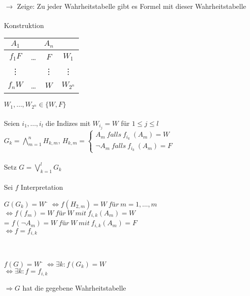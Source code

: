 \noindent\\
$\rightarrow$ Zeige: Zu jeder Wahrheitstabelle gibt es Formel mit dieser Wahrheitstabelle\\
    
\noindent\\
Konstruktion\\

\begin{tabular}{c|c|c|c}
$A_1$ &  & $A_n$ &  \\
\hline
$f_1 F$ & … & $F$ & $W_1$\\
\vdots   &  & \vdots & \vdots \\
$f_n W$ & … & $W$ & $W_{2^n}$ \\
\end{tabular}
\hspace{1cm}$W_1, …, W_{2^n} \in \{W, F\}$\\
    
\noindent\\
Seien $i_1, …, i_l$ die Indizes mit $W_{i_j} = W$ für $1 \leq j \leq l$\\
$G_k = \bigwedge_{m=1}^n H_{k,m}$, $H_{k,m} = \begin{cases} A_m\ falls\ f_{i_k}\ (A_m)=W \\ \neg A_m\ falls\ f_{i_k}\ (A_m)=F \end{cases}$\\
    
\noindent\\
Setz $G = \bigvee_{k=1}^l G_k$\\
    
\noindent\\
Sei $f$ Interpretation\\
\begin{tabbing}
$G(G_k) = W$ \= $\Leftrightarrow f(H_{2,m}) = W\ für\ m=1, …, m$\\
\> $\Leftrightarrow f(f_m) = W\ für\ W\ mit\ f_{i,k}(A_m) = W$\\
\> = $f(\neg A_m) = W\ für\ W\ mit\ f_{i,k}(A_m) = F$\\
\> $\Leftrightarrow f = f_{i,k}$\\
\end{tabbing}

\noindent\\
\begin{tabbing}
$f(G) = W$ \= $\Leftrightarrow \exists k : f(G_k) = W$\\
\> $\Leftrightarrow \exists k: f= f_{i,k}$\\
\end{tabbing}
$\Rightarrow G$ hat die gegebene Wahrheitstabelle\\

